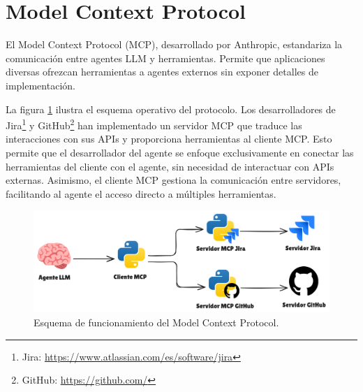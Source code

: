 \section{Model Context Protocol}
\label{sec:mcp_prots}
El Model Context Protocol (MCP), desarrollado por Anthropic, estandariza la comunicación entre agentes LLM y herramientas. Permite que aplicaciones diversas ofrezcan herramientas a agentes externos sin exponer detalles de implementación\cite{noauthor_model_nodate}.

La figura \ref{fig:mcp} ilustra el esquema operativo del protocolo. Los desarrolladores de Jira\footnote{Jira: \url{https://www.atlassian.com/es/software/jira}} y GitHub\footnote{GitHub: \url{https://github.com/}} han implementado un servidor MCP que traduce las interacciones con sus APIs y proporciona herramientas al cliente MCP. Esto permite que el desarrollador del agente se enfoque exclusivamente en conectar las herramientas del cliente con el agente, sin necesidad de interactuar con APIs externas. Asimismo, el cliente MCP gestiona la comunicación entre servidores, facilitando al agente el acceso directo a múltiples herramientas.

\begin{figure}[H]
  \centering
  \includegraphics[width=1\linewidth]{figures/mcp.png}
  \caption{Esquema de funcionamiento del Model Context Protocol.}
  \label{fig:mcp}
\end{figure}


